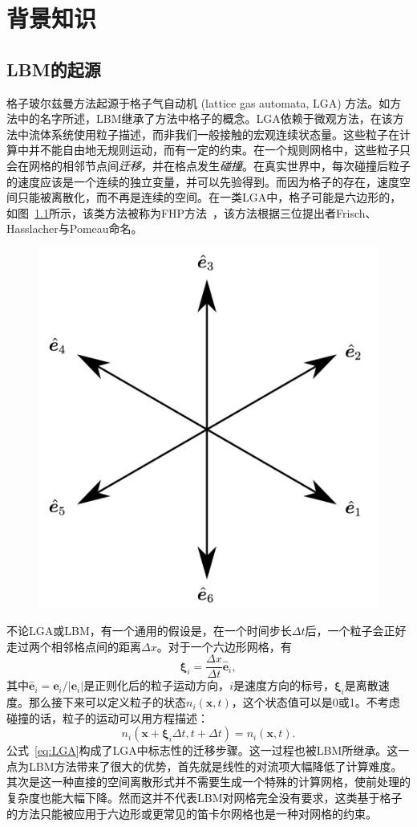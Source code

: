 \chapter{背景知识}

\section{LBM的起源}
格子玻尔兹曼方法起源于格子气自动机 (lattice gas automata, LGA) 方法。如方法中的名字所述，LBM继承了方法中格子的概念。LGA依赖于微观方法，在该方法中流体系统使用粒子描述，而非我们一般接触的宏观连续状态量。这些粒子在计算中并不能自由地无规则运动，而有一定的约束。在一个规则网格中，这些粒子只会在网格的相邻节点间\textit{迁移}，并在格点发生\textit{碰撞}。在真实世界中，每次碰撞后粒子的速度应该是一个连续的独立变量，并可以先验得到。而因为格子的存在，速度空间只能被离散化，而不再是连续的空间。在一类LGA中，格子可能是六边形的，如图~\ref{img:LGA_lattice}所示，该类方法被称为FHP方法~\cite{frisch1986lattice}，该方法根据三位提出者Frisch、Hasslacher与Pomeau命名。

\begin{figure}[htb]
    \centering
      \includegraphics[width=0.5\columnwidth]{figures/LGA_lattice.png}
    \label{img:LGA_lattice}
\end{figure}

不论LGA或LBM，有一个通用的假设是，在一个时间步长$\Delta t$后，一个粒子会正好走过两个相邻格点间的距离$\Delta x$。对于一个六边形网格，有
\begin{equation}
    \mathbf{\xi}_i=\frac{\Delta x}{\Delta t}\hat{\mathbf{e}}_i,
\end{equation}
其中$\hat{\mathbf{e}}_i=\mathbf{e}_i/|\mathbf{e}_i|$是正则化后的粒子运动方向，$i$是速度方向的标号，$\mathbf{\xi}_i$是离散速度。那么接下来可以定义粒子的状态$n_{i}(\mathbf{x},t)$，这个状态值可以是0或1。不考虑碰撞的话，粒子的运动可以用方程描述：
\begin{equation}
    n_{i}(\mathbf{x}+\mathbf{\xi}_i \Delta t,t+\Delta t)=n_{i}(\mathbf{x},t).
    \label{eq:LGA}
\end{equation}
公式~\ref{eq:LGA}构成了LGA中标志性的迁移步骤。这一过程也被LBM所继承。这一点为LBM方法带来了很大的优势，首先就是线性的对流项大幅降低了计算难度。其次是这一种直接的空间离散形式并不需要生成一个特殊的计算网格，使前处理的复杂度也能大幅下降。然而这并不代表LBM对网格完全没有要求，这类基于格子的方法只能被应用于六边形或更常见的笛卡尔网格也是一种对网格的约束。

